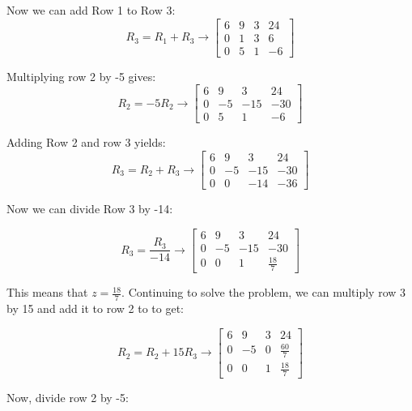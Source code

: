 \begin{mdframed}[backgroundcolor=blue!10!white]
Now we can add Row 1 to Row 3:
\begin{equation*}
	R_3 = R_1 + R_3
	\longrightarrow
\begin{bmatrix}
	6 & 9 & 3 & 24 \\
	0 & 1 & 3 & 6\\
	0 & 5 & 1 & -6 
\end{bmatrix} 	
\end{equation*}

Multiplying row 2 by -5 gives:
\begin{equation*}
	R_2 = -5R_2
	\longrightarrow
	\begin{bmatrix}
		6 & 9 & 3 & 24 \\
		0 & -5 & -15 & -30\\
		0 & 5 & 1 & -6 
	\end{bmatrix} 	
\end{equation*}

Adding Row 2 and row 3 yields:
\begin{equation*}
	R_3 = R_2 + R_3
	\longrightarrow
	\begin{bmatrix}
		6 & 9 & 3 & 24 \\
		0 & -5 & -15 & -30\\
		0 & 0 & -14 & -36 
	\end{bmatrix} 	
\end{equation*}

Now we can divide Row 3 by -14:

\begin{equation*}
	R_3 = \frac{R_3}{-14}
	\longrightarrow
	\begin{bmatrix}
		6 & 9 & 3 & 24 \\
		0 & -5 & -15 & -30\\
		0 & 0 & 1 & \frac{18}{7} 
	\end{bmatrix} 	
\end{equation*}

This means that $z = \frac{18}{7}$.  Continuing to solve the problem, we can multiply row 3 by 15 and add it to row 2 to to get: 

\begin{equation*}
	R_2 = R_2 + 15 R_3  
	\longrightarrow
	\begin{bmatrix}
		6 & 9 & 3 & 24 \\
		0 & -5 & 0 & \frac{60}{7}\\
		0 & 0 & 1 & \frac{18}{7} 
	\end{bmatrix} 	
\end{equation*}

Now, divide row 2 by -5:


\end{mdframed}
